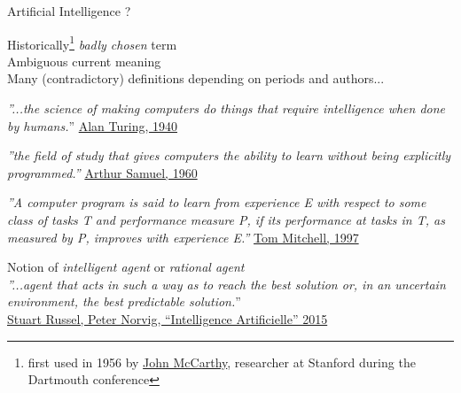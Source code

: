 \documentclass[10pt,serif,mathserif,compress,hyperref={colorlinks}]{beamer}
\begin{document}
\begin{frame}{Artificial Intelligence ?}

  \vspace*{-1mm}
  \begin {bclogo}[noborder=true, couleur=gray!50, couleurBarre=Chocolate, logo=\bctrombone, margeG=-0.5]
    {}
    \vspace*{-5mm}
    Historically\footnote{{\tiny first used in 1956 by \href{https://en.wikipedia.org/wiki/John\_McCarthy\_\%28computer\_scientist\%29}{John McCarthy},
    researcher at Stanford during the Dartmouth conference}} {\it badly chosen} term\\
    Ambiguous current meaning\\
    Many (contradictory) definitions depending on periods and authors...
    \end{bclogo}
  \medskip
  \begin{itemize}
    {\small
    \item {\em ''...the science of making computers do things that require intelligence when done by humans.}''
      {\tiny \href{http://www.alanturing.net/turing\_archive/pages/reference\%20articles/what\%20is\%20ai.html}{Alan Turing, 1940}}
      
    \item {\em ''the field of study that gives computers the ability to learn without being explicitly programmed.''}
      {\tiny  \href{http://infolab.stanford.edu/pub/voy/museum/samuel.html}{Arthur Samuel, 1960}}
      
    \item {\em ''A computer program is said to learn from experience E with respect to some class of tasks T and performance measure P,
      if its performance at tasks in T, as measured by P, improves with experience E.''}
      {\tiny \href{https://www.cs.cmu.edu/~tom/}{Tom Mitchell, 1997}}
      
    \item Notion of {\em intelligent agent} or {\em rational agent}\\
      {\em ''...agent that acts in such a way as to
        reach the best solution or, in an uncertain environment, the best predictable solution.}''\\
      {\tiny  \hyperlink{refRusselNorvig}{Stuart Russel, Peter Norvig, ``Intelligence Artificielle'' 2015}}
    }
  \end{itemize}
  
\end{frame}
\end{document}
